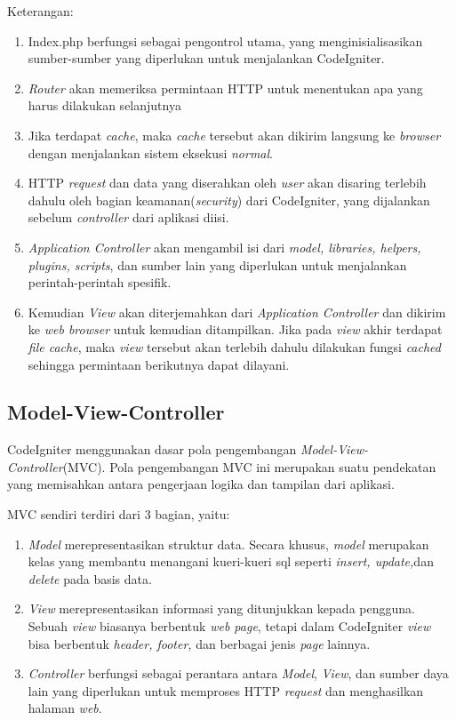 Keterangan:
\begin{enumerate}
	\item Index.php berfungsi sebagai pengontrol utama, yang menginisialisasikan sumber-sumber yang diperlukan untuk menjalankan CodeIgniter.
	\item \textit{Router} akan memeriksa permintaan HTTP untuk menentukan apa yang harus dilakukan selanjutnya
	\item Jika terdapat \textit{cache}, maka \textit{cache} tersebut akan dikirim langsung ke \textit{browser} dengan menjalankan sistem eksekusi \textit{normal}.
	\item  HTTP \textit{request} dan data yang diserahkan oleh \textit{user} akan disaring terlebih dahulu oleh bagian keamanan(\textit{security}) dari CodeIgniter, yang dijalankan sebelum \textit{controller} dari aplikasi diisi.
	\item \textit{Application Controller} akan mengambil isi dari \textit{model, libraries, helpers, plugins, scripts}, dan sumber lain yang diperlukan untuk menjalankan perintah-perintah spesifik.
	\item Kemudian \textit{View} akan diterjemahkan dari \textit{Application Controller} dan dikirim ke \textit{web browser} untuk kemudian ditampilkan. Jika pada \textit{view} akhir terdapat \textit{file cache}, maka \textit{view} tersebut akan terlebih dahulu dilakukan fungsi \textit{cached} sehingga permintaan berikutnya dapat dilayani.
\end{enumerate}

\subsection{Model-View-Controller}
\label{sub: MVC}

CodeIgniter menggunakan dasar pola pengembangan \textit{Model-View-Controller}(MVC). Pola pengembangan MVC ini merupakan suatu pendekatan yang memisahkan antara pengerjaan logika dan tampilan dari aplikasi.

MVC sendiri terdiri dari 3 bagian, yaitu:
\begin{enumerate}
	\item \textit{Model} merepresentasikan struktur data. Secara khusus, \textit{model} merupakan kelas yang membantu menangani kueri-kueri sql seperti \textit{insert, update,}dan \textit{delete} pada basis data.
	\item \textit{View} merepresentasikan informasi yang ditunjukkan kepada pengguna. Sebuah \textit{view} biasanya berbentuk \textit{web page}, tetapi dalam CodeIgniter \textit{view} bisa berbentuk \textit{header, footer,} dan berbagai jenis \textit{page} lainnya.
	\item \textit{Controller} berfungsi sebagai perantara antara \textit{Model}, \textit{View}, dan sumber daya lain yang diperlukan untuk memproses HTTP \textit{request} dan menghasilkan halaman \textit{web}.
\end{enumerate}

